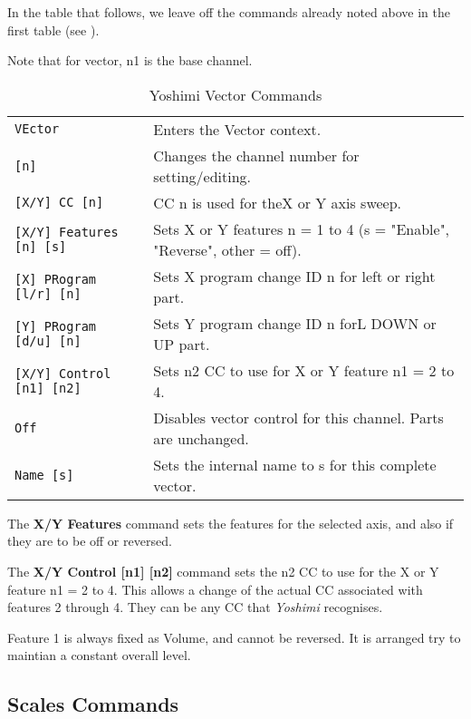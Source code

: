    In the table that follows, we leave off the commands already noted
   above in the first table
   (see ).

   Note that for vector, n1 is the base channel.

   \begin{table}[H]
      \centering
      \caption{Yoshimi Vector Commands}
      \label{table:yoshimi_text_vector_commands}
      \begin{tabular}{l l}

\texttt{VEctor} &
   Enters the Vector context. \\
   \texttt{[n]} &
   Changes the channel number for setting/editing.\\
\texttt{[X/Y] CC [n]} &
   CC n is used for theX or Y axis sweep. \\
\texttt{[X/Y] Features [n] [s]} &
   Sets X or Y features n = 1 to 4 (s = "Enable", "Reverse", other = off).  \\
\texttt{[X] PRogram [l/r] [n]} &
   Sets X program change ID n for left or right part. \\
\texttt{[Y] PRogram [d/u] [n]} &
   Sets Y program change ID n forL DOWN or UP part. \\
\texttt{[X/Y] Control [n1] [n2]} &
   Sets n2 CC to use for X or Y feature n1 = 2 to 4. \\
\texttt{Off} &
   Disables vector control for this channel.  Parts are unchanged. \\
\texttt{Name [s]} &
   Sets the internal name to s for this complete vector.  \\

      \end{tabular}
   \end{table}

   The \textbf{X/Y Features} command sets the features for the
   selected axis, and also if they are to be off or reversed.

   The \textbf{X/Y Control [n1] [n2]} command
   sets the n2 CC to use for the X or Y feature n1 = 2 to 4.
   This allows a change of the actual CC associated with features 2 through 4.
   They can be any CC that \textsl{Yoshimi} recognises.

   Feature 1 is always fixed as Volume, and cannot be reversed. It is arranged
   try to maintian a constant overall level.

\subsection{Scales Commands}
\label{subsec:command_line_scales_command_list}


